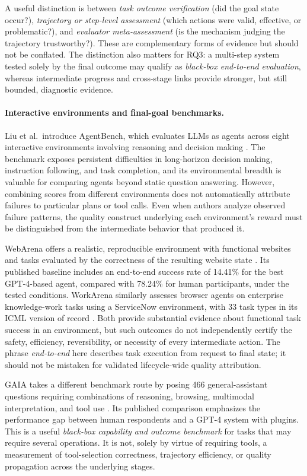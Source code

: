 A useful distinction is between \emph{task outcome verification} (did the goal state occur?), \emph{trajectory or step-level assessment} (which actions were valid, effective, or problematic?), and \emph{evaluator meta-assessment} (is the mechanism judging the trajectory trustworthy?). These are complementary forms of evidence but should not be conflated. The distinction also matters for RQ3: a multi-step system tested solely by the final outcome may qualify as \emph{black-box end-to-end evaluation}, whereas intermediate progress and cross-stage links provide stronger, but still bounded, diagnostic evidence.

\paragraph{Interactive environments and final-goal benchmarks.}
Liu et al.\ introduce AgentBench, which evaluates LLMs as agents across eight interactive environments involving reasoning and decision making \cite{liu2024agentbench}. The benchmark exposes persistent difficulties in long-horizon decision making, instruction following, and task completion, and its environmental breadth is valuable for comparing agents beyond static question answering. However, combining scores from different environments does not automatically attribute failures to particular plans or tool calls. Even when authors analyze observed failure patterns, the quality construct underlying each environment's reward must be distinguished from the intermediate behavior that produced it.

WebArena offers a realistic, reproducible environment with functional websites and tasks evaluated by the correctness of the resulting website state \cite{zhou2024webarena}. Its published baseline includes an end-to-end success rate of 14.41\% for the best GPT-4-based agent, compared with 78.24\% for human participants, under the tested conditions. WorkArena similarly assesses browser agents on enterprise knowledge-work tasks using a ServiceNow environment, with 33 task types in its ICML version of record \cite{drouin2024workarena}. Both provide substantial evidence about functional task success in an environment, but such outcomes do not independently certify the safety, efficiency, reversibility, or necessity of every intermediate action. The phrase \emph{end-to-end} here describes task execution from request to final state; it should not be mistaken for validated lifecycle-wide quality attribution.

GAIA takes a different benchmark route by posing 466 general-assistant questions requiring combinations of reasoning, browsing, multimodal interpretation, and tool use \cite{mialon2024gaia}. Its published comparison emphasizes the performance gap between human respondents and a GPT-4 system with plugins. This is a useful \emph{black-box capability and outcome benchmark} for tasks that may require several operations. It is not, solely by virtue of requiring tools, a measurement of tool-selection correctness, trajectory efficiency, or quality propagation across the underlying stages.

